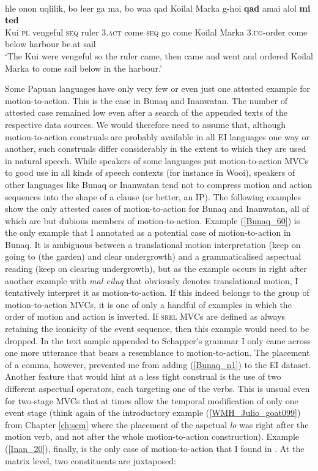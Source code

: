 \ea \label{KYO003}
\\
\gll hle onon uqlilik, bo leer ga ma, bo waa qad Koilal Marka g-hoi \textbf{qad} amai alol \textbf{mi} \textbf{ted} \\
Kui \textsc{pl} vengeful \textsc{seq} ruler \textsc{3}.\textsc{act} come \textsc{seq} go come Koilal Marka \textsc{3}.\textsc{ug}-order come below harbour be.at sail \\
\glft `The Kui were vengeful so the ruler came, then came and went and ordered Koilal Marka to come sail below in the harbour.'\\ 
\z

Some Papuan languages have only very few or even just one attested example for motion-to-action. This is the case in Bunaq and Inanwatan. The number of attested case remained low even after a search of the appended texts of the respective data sources. We would therefore need to assume that, although motion-to-action construals are probably available in all EI languages one way or another, such construals differ considerably in the extent to which they are used in natural speech. While speakers of some languages put motion-to-action MVCs to good use in all kinds of speech contexts (for instance in Wooi), speakers of other languages like Bunaq or Inanwatan tend not to compress motion and action sequences into the shape of a clause (or better, an IP). The following examples show the only attested cases of motion-to-action for Bunaq and Inanwatan, all of which are but dubious members of motion-to-action. Example (\ref{Bunaq_60}) is the only example that I annotated as a potential case of motion-to-action in Bunaq. It is ambiguous between a translational motion interpretation (keep on going to (the garden) and clear undergrowth) and a grammaticalised aspectual reading (keep on clearing undergrowth), but as the example occurs in \citet[463]{schapper2009bunaq} right after another example with \textit{mal ciluq} that obviously denotes translational motion, I tentatively interpret it as motion-to-action. If this indeed belongs to the group of motion-to-action MVCs, it is one of only a handful of examples in which the order of motion and action is inverted. If \textsc{srel} MVCs are defined as always retaining the iconicity of the event sequence, then this example would need to be dropped. In the text sample appended to Schapper's grammar I only came across one more utterance that bears a resemblance to motion-to-action. The placement of a comma, however, prevented me from adding (\ref{Bunaq_n1}) to the EI dataset. Another feature that would hint at a less tight construal is the use of two different aspectual operators, each targeting one of the verbs. This is unsual even for two-stage MVCs that at times allow the temporal modification of only one event stage (think again of the introductory example (\ref{WMH_Julio_goat099}) from Chapter \ref{ch:sem} where the placement of the aspctual \textit{lo} was right after the motion verb, and not after the whole motion-to-action construction). Example (\ref{Inan_20}), finally, is the only case of motion-to-action that I found in \citet{devries2004}. At the matrix level, two constituents are juxtaposed: 